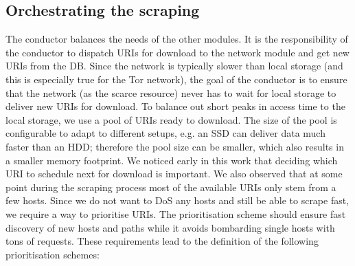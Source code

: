 \documentclass[USenglish,oneside,twocolumn]{article}
\begin{document}
\subsection{Orchestrating the scraping}
The conductor balances the needs of the other modules. It is the responsibility of the conductor to dispatch URIs for download to the network module and get new URIs from the DB. Since the network is typically slower than local storage (and this is especially true for the Tor network), the goal of the conductor is to ensure that the network (as the scarce resource) never has to wait for local storage to deliver new URIs for download. To balance out short peaks in access time to the local storage, we use a pool of URIs ready to download. The size of the pool is configurable to adapt to different setups, e.g. an SSD can deliver data much faster than an HDD; therefore the pool size can be smaller, which also results in a smaller memory footprint.
We noticed early in this work that deciding which URI to schedule next for download is important. We also observed  that at some point during the scraping process most of the available URIs only stem from a few hosts. Since we do not want to DoS any hosts and still be able to scrape fast, we require a way to prioritise URIs. The prioritisation scheme should ensure fast discovery of new hosts and paths while it avoids bombarding single hosts with tons of requests. These requirements lead to the definition of the following prioritisation schemes:
\end{document}
